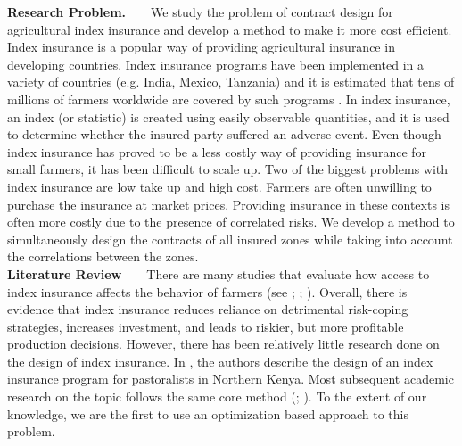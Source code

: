 \documentclass[12pt]{article}
\begin{document}
%
%
%
{
\doublespacing
\noindent
\textbf{Research Problem.}\ \ \ \
We study the problem of contract design for agricultural index insurance and develop a method to make it more cost efficient. Index insurance is a popular way of providing agricultural insurance in developing countries. Index insurance programs have been implemented in a variety of countries (e.g. India, Mexico, Tanzania) and it is estimated that tens of millions of farmers worldwide are covered by such programs \cite{greatrex2015scaling}. In index insurance, an index (or statistic) is created using easily observable quantities, and it is used to determine whether the insured party suffered an adverse event. Even though index insurance has proved to be a less costly way of providing insurance for small farmers, it has been difficult to scale up. Two of the biggest problems with index insurance are low take up and high cost. Farmers are often unwilling to purchase the insurance at market prices. Providing insurance in these contexts is often more costly due to the presence of correlated risks. We develop a method to simultaneously design the contracts of all insured zones while taking into account the correlations between the zones. 
\noindent
\\\textbf{Literature Review}\ \ \ \
There are many studies that evaluate how access to index insurance affects the behavior of farmers (see \cite{karlan2014agricultural}; \cite{cole2013barriers}; \cite{jensen2017agricultural}). Overall, there is evidence that index insurance reduces reliance on detrimental risk-coping strategies, increases investment, and leads to riskier, but more profitable production decisions. However, there has been relatively little research done on the design of index insurance. In \cite{chantarat2013designing}, the authors describe the design of an index insurance program for pastoralists in Northern Kenya. Most subsequent academic research on the topic follows the same core method (\cite{flatnes2018improving}; \cite{jensen2019does}). To the extent of our knowledge, we are the first to use an optimization based approach to this problem. 
}
\end{document}
